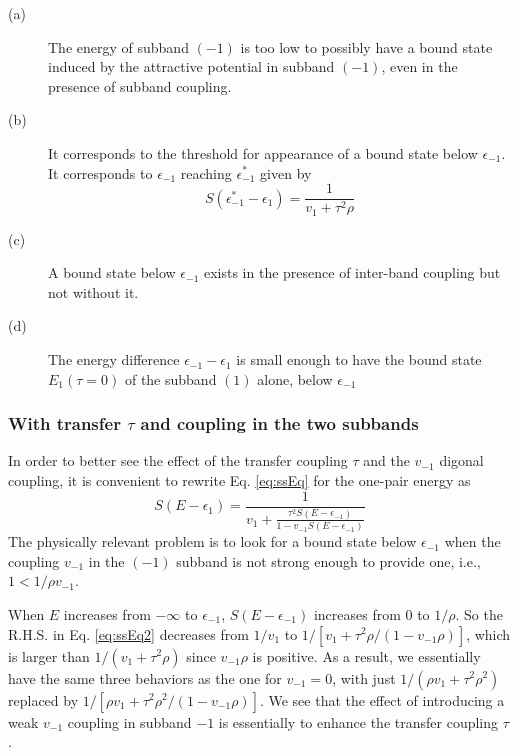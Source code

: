 \documentclass[11pt]{article} %
\begin{document}
\begin{description}
 \item[(a)] The energy of subband $(-1)$ is too low to possibly have a bound state induced by the attractive potential in subband $(-1)$, even in the presence of subband coupling.
 \item[(b)] It corresponds  to the threshold for appearance of a bound state below $\epsilon_{{-1}}$.  It corresponds to $\epsilon_{-1}$ reaching $\epsilon_{-1}^{*}$ given by 
 \begin{equation}
 S(\epsilon^{*}_{-1}-\epsilon_{1})=\frac{1}{v_{1}+\tau^{2}\rho}
 \end{equation}
 \item[(c)] A bound state below $\epsilon_{-1}$ exists in the presence of inter-band coupling but not without it.
 \item[(d)] The energy difference $\epsilon_{-1}-\epsilon_{1}$ is small enough to have the bound state $E_{1}(\tau=0)$ of the subband $(1)$ alone, below $\epsilon_{-1}$

\end{description}

\subsubsection{With transfer $\tau$ and coupling in the two subbands}
In order to better see the effect of the transfer coupling $\tau$ and the $v_{-1}$ digonal coupling, it is convenient to rewrite Eq. \ref{eq:ssEq} for the one-pair energy as 
\begin{equation}\label{eq:ssEq2}
S(E-\epsilon_1)=\frac{1}{\displaystyle v_1+\frac{\tau^2S(E-\epsilon_{-1})}{1-v_{-1}S(E-\epsilon_{-1})}}
\end{equation}
The physically relevant problem is to look for a bound state below $\epsilon_{-1}$ when the coupling $v_{-1}$ in the $(-1)$ subband is not strong enough to provide one, i.e., $1<1/\rho{}v_{-1}$. 

When $E$ increases from $-\infty$ to $\epsilon_{-1}$, $S(E-\epsilon_{-1})$ increases from $0$ to $1/\rho$.  So the R.H.S. in Eq. \ref{eq:ssEq2} decreases from $1/v_1$ to $1/[v_1+\tau^2\rho/(1-v_{-1}\rho)]$, which is larger than $1/(v_1+\tau^2\rho)$ since $v_{-1}\rho$ is positive.  As a result, we essentially have the same three behaviors as the one for $v_{-1}=0$, with just $1/(\rho{}v_1+\tau^2\rho^2)$ replaced by $1/[\rho{}v_1+\tau^2\rho^2/(1-v_{-1}\rho)]$.  We see that the effect of introducing a weak $v_{-1}$ coupling in subband $-1$ is essentially to enhance the transfer coupling $\tau$. 
\end{document}
